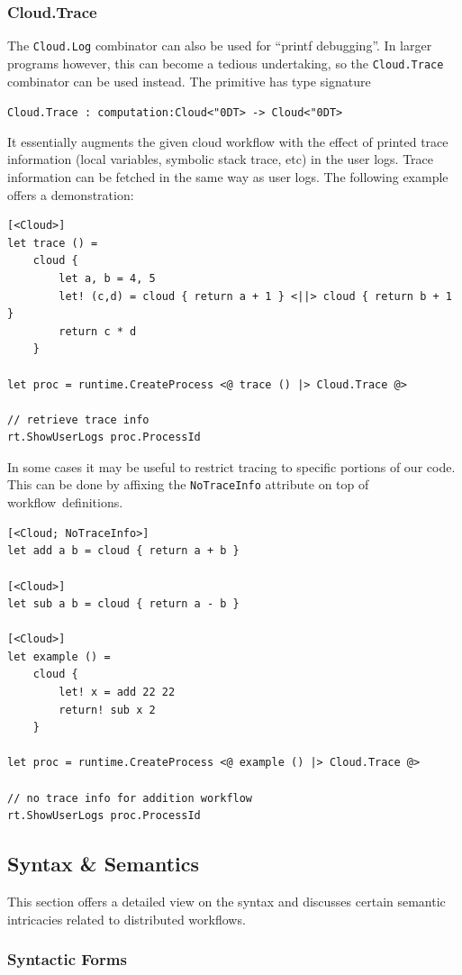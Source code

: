 \documentclass[9pt,a4paper]{article}
\newcommand{\centertt}[1]{\begin{center}\texttt{#1}\end{center}}
\newcommand{\uq}{\char"0D}
\begin{document}
\subsubsection*{Cloud.Trace}
The \texttt{Cloud.Log} combinator can also be used for ``printf debugging''. 
In larger programs however, this can become a tedious undertaking, 
so the \texttt{Cloud.Trace} combinator can be used instead. 
The primitive has type signature
\centertt{Cloud.Trace : computation:Cloud<\uq{}T> -> Cloud<\uq{}T>}
It essentially augments the given cloud workflow with the effect of printed trace information
(local variables, symbolic stack trace, etc)
in the user logs. Trace information can be fetched in the same way as user logs. 
The following example offers a demonstration:
\begin{lstlisting}
[<Cloud>]
let trace () =
    cloud {
        let a, b = 4, 5
        let! (c,d) = cloud { return a + 1 } <||> cloud { return b + 1 }
        return c * d
    }
    
let proc = runtime.CreateProcess <@ trace () |> Cloud.Trace @>

// retrieve trace info
rt.ShowUserLogs proc.ProcessId
\end{lstlisting}
In some cases it may be useful to restrict tracing to specific portions of our code. 
This can be done by affixing the \texttt{NoTraceInfo} attribute on top of workflow\
definitions.
\begin{lstlisting}
[<Cloud; NoTraceInfo>]
let add a b = cloud { return a + b }
 
[<Cloud>]
let sub a b = cloud { return a - b }
 
[<Cloud>]
let example () =
    cloud {
        let! x = add 22 22
        return! sub x 2
    }
    
let proc = runtime.CreateProcess <@ example () |> Cloud.Trace @>

// no trace info for addition workflow
rt.ShowUserLogs proc.ProcessId
\end{lstlisting}

\subsection{Syntax \& Semantics}

This section offers a detailed view on the syntax and discusses certain semantic 
intricacies related to distributed workflows.

\subsubsection*{Syntactic Forms}
\end{document}
